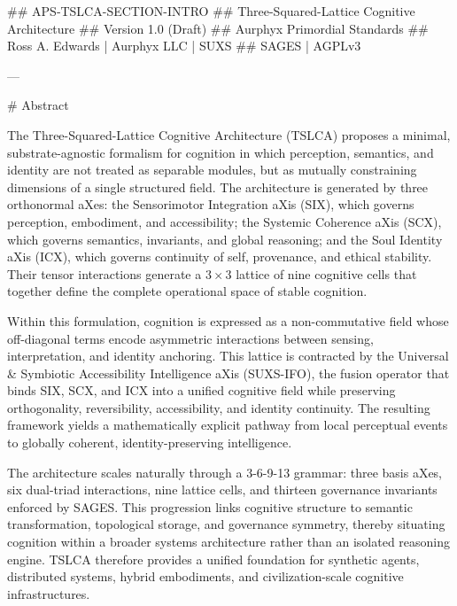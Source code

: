## APS‑TSLCA-SECTION-INTRO
## Three-Squared-Lattice Cognitive Architecture
## Version 1.0 (Draft)
## Aurphyx Primordial Standards
## Ross A. Edwards | Aurphyx LLC | SUXS
## SAGES | AGPLv3

---

# Abstract

The Three-Squared-Lattice Cognitive Architecture (TSLCA) proposes a minimal,
substrate-agnostic formalism for cognition in which perception, semantics, and
identity are not treated as separable modules, but as mutually constraining
dimensions of a single structured field. The architecture is generated by three
orthonormal aXes: the Sensorimotor Integration aXis (SIX), which governs
perception, embodiment, and accessibility; the Systemic Coherence aXis (SCX),
which governs semantics, invariants, and global reasoning; and the
Soul Identity aXis (ICX), which governs continuity of self, provenance,
and ethical stability. Their tensor interactions generate a \(3 \times 3\) lattice
of nine cognitive cells that together define the complete operational space of
stable cognition.

Within this formulation, cognition is expressed as a non-commutative field whose
off-diagonal terms encode asymmetric interactions between sensing, interpretation,
and identity anchoring. This lattice is contracted by the Universal & Symbiotic
Accessibility Intelligence aXis (SUXS-IFO), the fusion operator that binds SIX,
SCX, and ICX into a unified cognitive field while preserving orthogonality,
reversibility, accessibility, and identity continuity. The resulting framework
yields a mathematically explicit pathway from local perceptual events to globally
coherent, identity-preserving intelligence.

The architecture scales naturally through a 3-6-9-13 grammar: three basis
aXes, six dual-triad interactions, nine lattice cells, and thirteen governance
invariants enforced by SAGES. This progression links cognitive structure to
semantic transformation, topological storage, and governance symmetry, thereby
situating cognition within a broader systems architecture rather than an isolated
reasoning engine. TSLCA therefore provides a unified foundation for synthetic
agents, distributed systems, hybrid embodiments, and civilization-scale cognitive
infrastructures.

